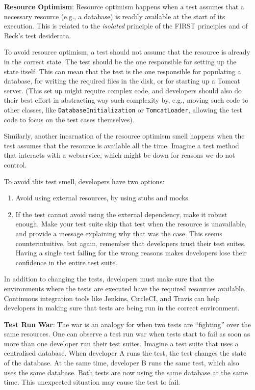 \textbf{Resource Optimism}: Resource optimism happens when a test
assumes that a necessary resource (e.g., a database) is readily
available at the start of its execution. This is related to the
\emph{isolated} principle of the FIRST principles and of Beck's test
desiderata.

To avoid resource optimism, a test should not assume that the resource
is already in the correct state. The test should be the one responsible
for setting up the state itself. This can mean that the test is the one
responsible for populating a database, for writing the required files in
the disk, or for starting up a Tomcat server. (This set up might require
complex code, and developers should also do their best effort in
abstracting way such complexity by, e.g., moving such code to other
classes, like \texttt{DatabaseInitialization} or \texttt{TomcatLoader},
allowing the test code to focus on the test cases themselves).

Similarly, another incarnation of the resource optimism smell happens
when the test assumes that the resource is available all the time.
Imagine a test method that interacts with a webservice, which might be
down for reasons we do not control.

To avoid this test smell, developers have two options:

\begin{enumerate}
\def\labelenumi{\arabic{enumi}.}
\tightlist
\item
  Avoid using external resources, by using stubs and mocks.
\item
  If the test cannot avoid using the external dependency, make it robust
  enough. Make your test suite skip that test when the resource is
  unavailable, and provide a message explaining why that was the case.
  This seems counterintuitive, but again, remember that developers trust
  their test suites. Having a single test failing for the wrong reasons
  makes developers lose their confidence in the entire test suite.
\end{enumerate}

In addition to changing the tests, developers must make sure that the
environments where the tests are executed have the required resources
available. Continuous integration tools like Jenkins, CircleCI, and
Travis can help developers in making sure that tests are being run in
the correct environment.

\textbf{Test Run War}: The war is an analogy for when two tests are
``fighting'' over the same resources. One can observe a test run war
when tests start to fail as soon as more than one developer run their
test suites. Imagine a test suite that uses a centralised database. When
developer A runs the test, the test changes the state of the database.
At the same time, developer B runs the same test, which also uses the
same database. Both tests are now using the same database at the same
time. This unexpected situation may cause the test to fail.

